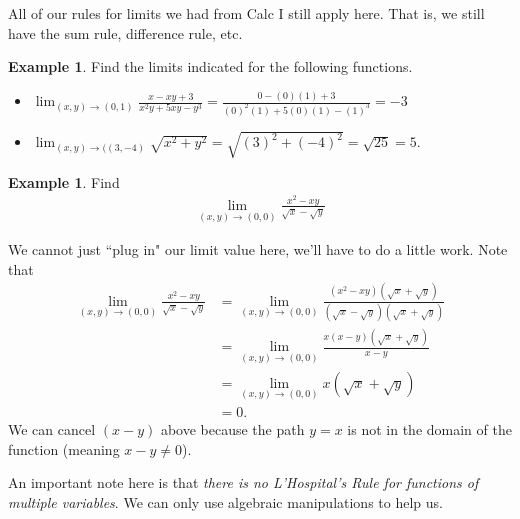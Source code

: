 \documentclass[12pt, letter]{article}
\theoremstyle{plain}
\numberwithin{theorem}{section}
\theoremstyle{definition}
\newtheorem{example}[theorem]{Example}
\begin{document}
\bigskip

All of our rules for limits we had from Calc I still apply here. That is, we still have the sum rule, difference rule, etc.

\bigskip

\hrulefill

\bigskip

\begin{example}
Find the limits indicated for the following functions.

\smallskip

\begin{itemize}
\item $\lim_{(x,y) \to (0,1)} \frac{x-xy+3}{x^2y+5xy-y^3} = \frac{0-(0)(1)+3}{(0)^2(1)+5(0)(1)-(1)^3}
=-3$
\item $\lim_{(x,y) \to ((3,-4)} \sqrt{x^2+y^2} = \sqrt{(3)^2+(-4)^2}
=\sqrt{25} = 5$.
\end{itemize}
\end{example}

\bigskip

\hrulefill

\bigskip

\begin{example}
Find 
\begin{align*}
\lim_{(x,y)\to (0,0)} \frac{x^2-xy}{\sqrt{x}-\sqrt{y}}
\end{align*}

\smallskip

We cannot just ``plug in" our limit value here, we'll have to do a little work. Note that
\begin{align*}
\lim_{(x,y)\to (0,0)} \frac{x^2-xy}{\sqrt{x}-\sqrt{y}} &= \lim_{(x,y) \to (0,0)} \frac{(x^2-xy)(\sqrt{x}+\sqrt{y})}{(\sqrt{x}-\sqrt{y})(\sqrt{x}+\sqrt{y})}\\
&=\lim_{(x,y)\to (0,0)} \frac{x(x-y)(\sqrt{x}+\sqrt{y})}{x-y}\\
&=\lim_{(x,y) \to (0,0)} x(\sqrt{x}+\sqrt{y})\\
&= 0.
\end{align*}
We can cancel $(x-y)$ above because the path $y=x$ is not in the domain of the function (meaning $x-y \neq 0$).
\end{example}

\bigskip

An important note here is that \textit{there is no L'Hospital's Rule for functions of multiple variables}. We can only use algebraic manipulations to help us.

\bigskip
\end{document}
